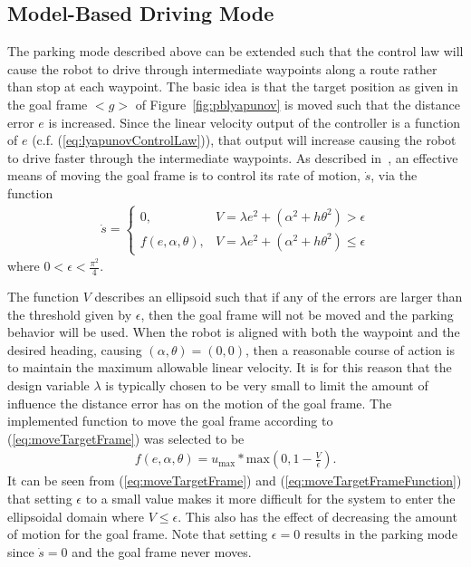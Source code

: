 \subsection{Model-Based Driving Mode}%
\label{sec:drivingMode}
The parking mode described above can be extended such that the control law will cause the robot to drive through intermediate waypoints along a route rather than stop at each waypoint. The basic idea is that the target position as given in the goal frame $<g>$ of Figure~\ref{fig:pblyapunov} is moved such that the distance error $e$ is increased. Since the linear velocity output of the controller is a function of $e$ (c.f. (\ref{eq:lyapunovControlLaw})), that output will increase causing the robot to drive faster through the intermediate waypoints. As described in~\cite{Aicardi_UnicycleLyapunov95}, an effective means of moving the goal frame is to control its rate of motion, $\dot{s}$, via the function
\begin{align}
\label{eq:moveTargetFrame}
\dot{s} =
\begin{cases}
0, & V = \lambda e^2 + (\alpha^2+h\theta^2) > \epsilon \\
f(e,\alpha,\theta), & V = \lambda e^2 + (\alpha^2+h\theta^2) \leq \epsilon
\end{cases}
\end{align}
where $0<\epsilon<\frac{\pi^2}{4}$.

The function $V$ describes an ellipsoid such that if any of the errors are larger than the threshold given by $\epsilon$, then the goal frame will not be moved and the parking behavior will be used. When the robot is aligned with both the waypoint and the desired heading, causing $(\alpha,\theta)=(0,0)$, then a reasonable course of action is to maintain the maximum allowable linear velocity. It is for this reason that the design variable $\lambda$ is typically chosen to be very small to limit the amount of influence the distance error has on the motion of the goal frame. The implemented function to move the goal frame according to (\ref{eq:moveTargetFrame}) was selected to be
\begin{align}
\label{eq:moveTargetFrameFunction}
f(e,\alpha,\theta) = u_{\text{max}} * \text{max}\left(0, 1 - \frac{V}{\epsilon}\right).
\end{align}
It can be seen from (\ref{eq:moveTargetFrame}) and (\ref{eq:moveTargetFrameFunction}) that setting $\epsilon$ to a small value makes it more difficult for the system to enter the ellipsoidal domain where $V\leq\epsilon$. This also has the effect of decreasing the amount of motion for the goal frame. Note that setting $\epsilon=0$ results in the parking mode since $\dot{s}=0$ and the goal frame never moves.

